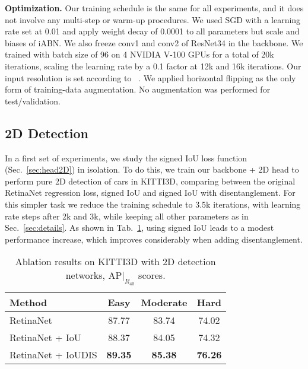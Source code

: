\documentclass[10pt,twocolumn,letterpaper]{article}
\newcommand{\iABN}{iABN\xspace}
\newcommand{\ioudis}{IoUDIS}
\renewcommand{\paragraph}[1]{

        \vspace{3pt}
	\noindent\textbf{#1}}
\begin{document}
\paragraph{Optimization.} Our training schedule is the same for all experiments, and it does not involve any multi-step or warm-up procedures. We used SGD with a learning rate set at 0.01 and apply weight decay of 0.0001 to all parameters but scale and biases of \iABN. We also freeze conv1 and conv2 of ResNet34 in the backbone. We trained with batch size of 96 on 4 NVIDIA V-100 GPUs for a total of 20k iterations, scaling the learning rate by a 0.1 factor at 12k and 16k iterations. Our input resolution is set according to ~\cite{Manhardt_2019_CVPR}. We applied horizontal flipping as the only form of training-data augmentation. No augmentation was performed for test/validation.



\subsection{2D Detection}

In a first set of experiments, we study the signed IoU loss function (Sec.~\ref{sec:head2D}) in isolation.
To do this, we train our backbone + 2D head to perform pure 2D detection of cars in KITTI3D, comparing between the original RetinaNet regression loss, signed IoU and signed IoU with disentanglement.
For this simpler task we reduce the training schedule to 3.5k iterations, with learning rate steps after 2k and 3k, while keeping all other parameters as in Sec.~\ref{sec:details}.
As shown in Tab.~\ref{tab:results2d}, using signed IoU leads to a modest performance increase, which improves considerably when adding disentanglement.
\begin{table}[th]
    \centering
    {\footnotesize
    \begin{tabular}{l|ccc}
        \toprule
        Method & Easy & Moderate & Hard \\
        \midrule
        RetinaNet & 87.77 & 83.74 & 74.02 \\
        RetinaNet + IoU & 88.37 & 84.05 & 74.32 \\
        RetinaNet + \ioudis & \textbf{89.35} & \textbf{85.38} & \textbf{76.26} \\
        \bottomrule
    \end{tabular}}
    \caption{Ablation results on KITTI3D with 2D detection networks, $\text{AP}|_{R_{40}}$ scores.}
    \vspace{-1em}
    \label{tab:results2d}
\end{table}
\end{document}
